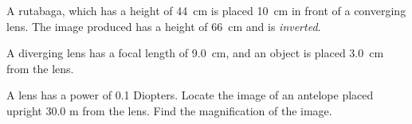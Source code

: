 \documentclass[10pt]{exam}
\begin{document}
\begin{questions}
  \question
    A rutabaga, which has a height of 44~cm is placed 10~cm in front of a converging lens.  The image produced has a height of 66~cm and is \emph{inverted}.  

    \vs

  \question
    A diverging lens has a focal length of 9.0~cm, and an object is placed 3.0~cm from the lens.

    \vs


  \question
    A lens has a power of 0.1 Diopters.  Locate the image of an antelope placed upright 30.0 m from the lens.  Find the magnification of the image.  
    \vs

\end{questions}
\end{document}
